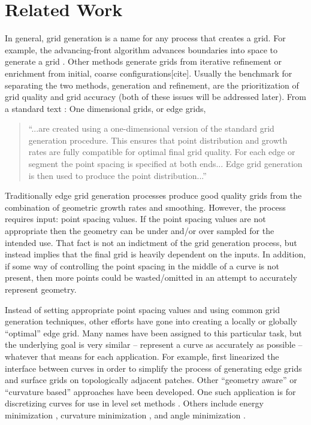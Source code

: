 \section{Related Work}
In general, grid generation is a name for any process that creates a grid.  For example, the advancing-front algorithm advances boundaries into space to generate a grid \cite{lohner88}.  Other methods generate grids from iterative refinement or enrichment from initial, coarse configurations[cite].  Usually the benchmark for separating the two methods, generation and refinement, are the prioritization of grid quality and grid accuracy (both of these issues will be addressed later).  From a standard text \cite{thompson98}: One dimensional grids, or edge grids, 

\begin{quotation}
\noindent ``...are created using a one-dimensional version of the standard grid generation procedure.  This ensures that point distribution and growth rates are fully compatible for optimal final grid quality.  For each edge or segment the point spacing is specified at both ends... Edge grid generation is then used to produce the point distribution...''
\end{quotation} 

\noindent Traditionally edge grid generation processes produce good quality grids from the combination of geometric growth rates and smoothing.  However, the process requires input: point spacing values.  If the point spacing values are not appropriate then the geometry can be under and/or over sampled for the intended use.  That fact is not an indictment of the grid generation process, but instead implies that the final grid is heavily dependent on the inputs.  In addition, if some way of controlling the point spacing in the middle of a curve is not present, then more points could be wasted/omitted in an attempt to accurately represent geometry.

Instead of setting appropriate point spacing values and using common grid generation techniques, other efforts have gone into creating a locally or globally ``optimal'' edge grid.  Many names have been assigned to this particular task, but the underlying goal is very similar -- represent a curve as accurately as possible -- whatever that means for each application.  For example, \cite{laug04} first linearized the interface between curves in order to simplify the process of generating edge grids and surface grids on topologically adjacent patches.  Other ``geometry aware'' or ``curvature based'' approaches have been developed.  One such application is for discretizing curves for use in level set methods \cite{macklin06}.  Others include energy minimization \cite{hofer04}, curvature minimization \cite{zehiry10}, and angle minimization \cite{ebeida10}.

